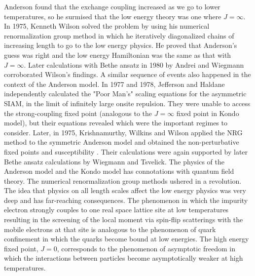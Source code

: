 Anderson found that the exchange coupling increased as we go to lower temperatures, so he surmised that the low energy theory was one where \(J=\infty\).
In 1975, Kenneth Wilson solved the problem by using his numerical renormalization group method in which he iteratively diagonalized chains of increasing length to go to the low energy physics.
He proved that Anderson's guess was right and the low energy Hamiltonian was the same as that with \(J=\infty\).
Later calculations with Bethe ansatz in 1980 by Andrei and Wiegmann \cite{andreiKondoreview,wiegmann_kondoexact_1981} corroborated Wilson's findings.
 A similar sequence of events also happened in the context of the Anderson model. In 1977 and 1978, Jefferson and Haldane independently calculated the "Poor Man's" scaling equations for the asymmetric SIAM, in the limit of infinitely large onsite repulsion. They were unable to access the strong-coupling fixed point (analogous to the \(J=\infty\) fixed point in Kondo model), but their equations revealed which were the important regimes to consider. Later, in 1975, Krishnamurthy, Wilkins and Wilson applied the NRG method to the symmetric Anderson model and obtained the non-perturbative fixed points and susceptibility \cite{hrk_wilson_1980}. Their calculations were again supported by later Bethe ansatz calculations by Wiegmann and Tsvelick\cite{tsvelickKondoreview}.
 The physics of the Anderson model and the Kondo model has connotations with quantum field theory. The numerical renormalization group methods ushered in a revolution. The idea that physics on all length scales affect the low energy physics was very deep and has far-reaching consequences. The phenomenon in which the impurity electron strongly couples to one real space lattice site at low temperatures resulting in the screening of the local moment via spin-flip scatterings with the mobile electrons at that site is analogous to the phenomenon of quark confinement in which the quarks become bound at low energies. The high energy fixed point, \(J=0\), corresponds to the phenomenon of asymptotic freedom in which the interactions between particles become asymptotically weaker at high temperatures.
